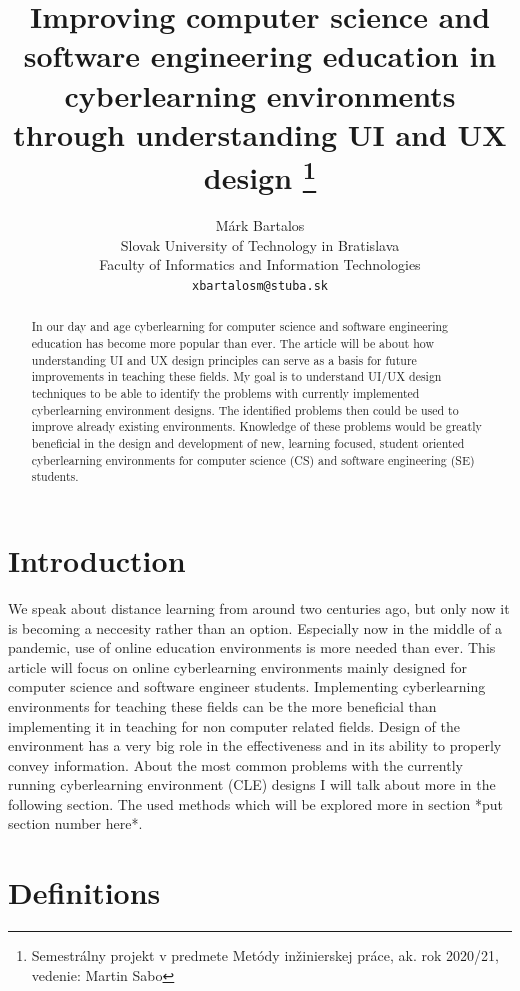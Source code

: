\documentclass[10pt,twoside,english,a4paper]{article}
\title{Improving computer science and software 
engineering education in cyberlearning 
environments through understanding UI and UX design
\thanks{Semestrálny projekt v predmete Metódy inžinierskej práce,
 ak. rok 2020/21, vedenie: Martin Sabo}}
\author{Márk Bartalos \\[2pt]
        \small{Slovak University of Technology in Bratislava}\\
        \small{Faculty of Informatics and Information Technologies}\\
        \small{\texttt{xbartalosm@stuba.sk}}
}
\begin{document}
\maketitle

\begin{abstract}
    In our day and age cyberlearning for computer science and software engineering education has become more popular than ever. 
The article will be about how understanding UI and UX design principles can serve as a basis for future improvements in teaching
these fields. My goal is to understand UI/UX design techniques to be able to identify the problems with currently 
implemented cyberlearning environment designs. The identified problems then could be used to improve already existing environments.
Knowledge of these problems would be greatly beneficial in the design and development of new, learning focused, student 
oriented cyberlearning environments for computer science (CS) and software engineering (SE) students.
\end{abstract}



\section{Introduction}
We speak about distance learning from around two centuries ago\cite{moore_2011_elearning}, but only now
it is becoming a neccesity rather than an option. Especially now in the middle of a pandemic, use of online 
education environments is more needed than ever. This article will focus on online cyberlearning environments 
mainly designed for computer science and software engineer students. Implementing cyberlearning 
environments for teaching these fields can be the more beneficial than implementing it in teaching for non computer 
related fields. Design of the environment has a very big role in the effectiveness and in 
its ability to properly convey information. 
About the most common problems with the currently running cyberlearning environment (CLE)
designs I will talk about more in the following section.
The used methods which will be explored more in section *put section number here*.

\section{Definitions}
\end{document}

